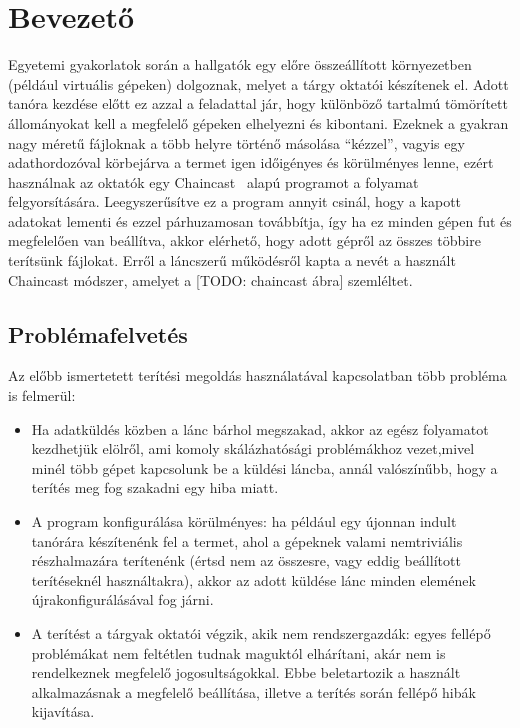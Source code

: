 \chapter{Bevezető} 

Egyetemi gyakorlatok során a hallgatók egy előre összeállított környezetben (például virtuális
gépeken) dolgoznak, melyet a tárgy oktatói készítenek el. Adott tanóra kezdése előtt 
ez azzal a feladattal jár, hogy különböző tartalmú tömörített állományokat kell a megfelelő gépeken elhelyezni és kibontani. Ezeknek a gyakran nagy méretű fájloknak a több helyre történő másolása ``kézzel'', vagyis egy adathordozóval körbejárva a termet igen időigényes és körülményes lenne, ezért használnak az oktatók egy Chaincast~\cite{kiraly2011chaincast} alapú programot a folyamat felgyorsítására. Leegyszerűsítve ez a program annyit csinál, hogy a kapott adatokat lementi és ezzel párhuzamosan továbbítja, így ha ez minden gépen fut és megfelelően van beállítva, akkor elérhető, hogy adott gépről az összes többire terítsünk fájlokat. Erről a láncszerű működésről kapta a nevét a használt Chaincast módszer, amelyet a [TODO: chaincast ábra] szemléltet.

\section{Problémafelvetés}

Az előbb ismertetett terítési megoldás használatával kapcsolatban több probléma is felmerül:

\begin{itemize}
  \item Ha adatküldés közben a lánc bárhol megszakad, akkor az egész folyamatot kezdhetjük elölről, ami komoly skálázhatósági problémákhoz vezet,mivel minél több gépet kapcsolunk be a küldési láncba, annál valószínűbb, hogy a terítés meg fog szakadni egy hiba miatt.
   \item A program konfigurálása körülményes: ha például egy újonnan indult tanórára készítenénk fel a termet, ahol a gépeknek valami nemtriviális részhalmazára terítenénk (értsd nem az összesre, vagy eddig beállított terítéseknél használtakra), akkor az adott küldése lánc minden elemének újrakonfigurálásával fog járni.
   \item A terítést a tárgyak oktatói végzik, akik nem rendszergazdák: egyes fellépő problémákat nem feltétlen tudnak maguktól elhárítani, akár nem is rendelkeznek megfelelő jogosultságokkal. Ebbe beletartozik a használt alkalmazásnak a megfelelő beállítása, illetve a terítés során fellépő hibák kijavítása.
\end{itemize}

